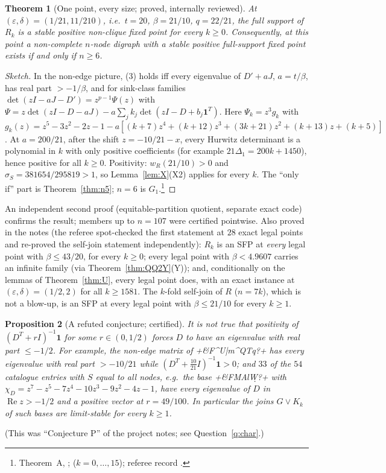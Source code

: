 \documentclass[11pt]{article}
\newtheorem{theorem}{Theorem}[section]
\newtheorem{proposition}[theorem]{Proposition}
\theoremstyle{definition}
\newcommand{\one}{\mathbf{1}}
\newcommand{\eps}{\varepsilon}
\newcommand{\Rea}{\operatorname{Re}}
\begin{document}
{\begin{theorem}[One point, every size; proved, internally reviewed]\label{thm:A}
At $(\eps,\delta)=(1/21,11/210)$, i.e.\ $t=20$, $\beta=21/10$, $q=22/21$, the full support of $R_k$ is a stable positive non-clique
fixed point for every $k\ge0$. Consequently, at this point a non-complete $n$-node digraph with a stable positive full-support fixed
point exists if and only if $n\ge6$.
\end{theorem}
\begin{proof}[Sketch]
In the non-edge picture, (3) holds iff every eigenvalue of $D'+aJ$, $a=t/\beta$, has real part $>-1/\beta$, and for sink-class
families $\det(zI-aJ-D')=z^{p-1}\Psi(z)$ with $\Psi=z\det(zI-D-aJ)-a\sum_jk_j\det(zI-D+b_j\one^T)$. Here $\Psi_k=z^3g_k$ with
$g_k(z)=z^5-3z^2-2z-1-a[(k+7)z^4+(k+12)z^3+(3k+21)z^2+(k+13)z+(k+5)]$. At $a=200/21$, after the shift $z=-10/21-x$, every Hurwitz
determinant is a polynomial in $k$ with only positive coefficients (for example $21\Delta_1=200k+1450$), hence positive for all
$k\ge0$. Positivity: $w_R(21/10)>0$ and $\sigma_S=381654/295819>1$, so Lemma~\ref{lem:X}(X2) applies for every $k$. The
``only if'' part is Theorem~\ref{thm:n5}; $n=6$ is $G_1$.\footnote{Theorem~A, ;  ($k=0,\dots,15$); referee record .}
\end{proof}
An independent second proof (equitable-partition quotient, separate exact code) confirms the result; members up to $n=107$
were certified pointwise. Also proved in the notes (the referee spot-checked the first statement at $28$ exact legal points and
re-proved the self-join statement independently):
$R_k$ is an SFP at \emph{every} legal point with $\beta\le43/20$, for every $k\ge0$; every legal point with $\beta<4.9607$ carries an
infinite family (via Theorem~\ref{thm:QQ2Y}(Y)); and, conditionally on the lemmas of Theorem~\ref{thm:U}, every legal point
does, with an exact instance at $(\eps,\delta)=(1/2,2)$ for all $k\ge1581$. The $k$-fold self-join of $R$ ($n=7k$), which is not a
blow-up, is an SFP at every legal point with $\beta\le21/10$ for every $k\ge1$.

\begin{proposition}[A refuted conjecture; certified]\label{prop:P}
It is not true that positivity of $(D^T+rI)^{-1}\one$ for some $r\in(0,1/2)$ forces $D$ to have an eigenvalue with real part
$\le-1/2$. For example, the non-edge matrix of \dsix+&F^U|m^QTq?+ has every eigenvalue with real part $>-10/21$ while
$(D^T+\tfrac{10}{21}I)^{-1}\one>0$; and $33$ of the $54$ catalogue entries with $S$ equal to all nodes, e.g.\ the base \dsix+&FMAlW\d\y?+ with
$\chi_D=z^7-z^5-7z^4-10z^3-9z^2-4z-1$, have every eigenvalue of $D$ in $\Rea z>-1/2$ and a positive vector at $r=49/100$. In
particular the joins $G\vee K_k$ of such bases are limit-stable for every $k\ge1$.
\end{proposition}
(This was ``Conjecture P'' of the project notes; see Question~\ref{q:char}.)

}
\end{document}
